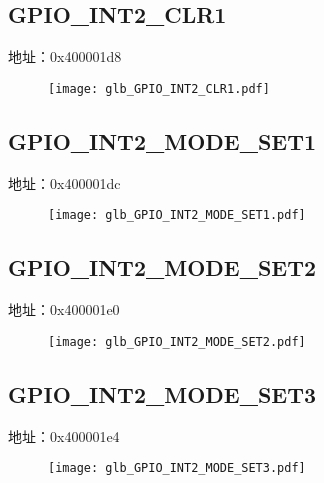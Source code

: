 \subsection{GPIO\_INT2\_CLR1}
\label{glb-GPIO-INT2-CLR1}
地址：0x400001d8
 \begin{figure}[H]
\texttt{[image: glb\_GPIO\_INT2\_CLR1.pdf]}
\end{figure}

\subsection{GPIO\_INT2\_MODE\_SET1}
\label{glb-GPIO-INT2-MODE-SET1}
地址：0x400001dc
 \begin{figure}[H]
\texttt{[image: glb\_GPIO\_INT2\_MODE\_SET1.pdf]}
\end{figure}

\subsection{GPIO\_INT2\_MODE\_SET2}
\label{glb-GPIO-INT2-MODE-SET2}
地址：0x400001e0
 \begin{figure}[H]
\texttt{[image: glb\_GPIO\_INT2\_MODE\_SET2.pdf]}
\end{figure}

\subsection{GPIO\_INT2\_MODE\_SET3}
\label{glb-GPIO-INT2-MODE-SET3}
地址：0x400001e4
 \begin{figure}[H]
\texttt{[image: glb\_GPIO\_INT2\_MODE\_SET3.pdf]}
\end{figure}

